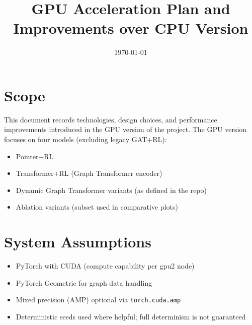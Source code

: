 \documentclass[11pt]{article}
\title{GPU Acceleration Plan and Improvements over CPU Version}
\author{}
\date{\today}
\begin{document}
\maketitle

\section{Scope}
This document records technologies, design choices, and performance improvements introduced in the GPU version of the project. The GPU version focuses on four models (excluding legacy GAT+RL):
\begin{itemize}[noitemsep]
  \item Pointer+RL
  \item Transformer+RL (Graph Transformer encoder)
  \item Dynamic Graph Transformer variants (as defined in the repo)
  \item Ablation variants (subset used in comparative plots)
\end{itemize}

\section{System Assumptions}
\begin{itemize}[noitemsep]
  \item PyTorch with CUDA (compute capability per gpu2 node)
  \item PyTorch Geometric for graph data handling
  \item Mixed precision (AMP) optional via \texttt{torch.cuda.amp}
  \item Deterministic seeds used where helpful; full determinism is not guaranteed
\end{itemize}
\end{document}

